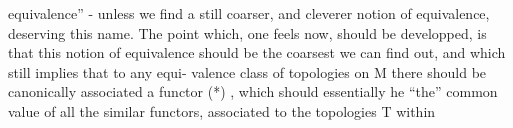 equivalence'' -  unless we find a still coarser,  and cleverer notion
of equivalence,  deserving this name.  The point which,  one feels now,
should be developped,  is that this notion of equivalence should be
the coarsest we can find out,  and which still implies that to any equi-%
valence class of topologies on M there should be canonically associated
a functor  (*) ,  which should essentially he ``the'' common value of
all the similar functors,  associated to the topologies T within 
